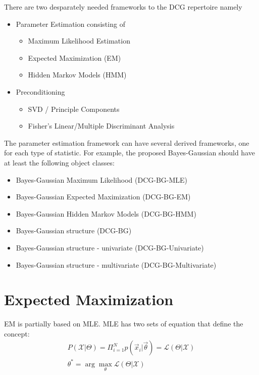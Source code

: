 There are two desparately needed frameworks to the DCG repertoire namely  
\begin{itemize}
	\item Parameter Estimation consisting of 
	\begin{itemize}
		\item Maximum Likelihood Estimation
		\item Expected Maximization (EM)
		\item Hidden Markov Models (HMM)
	\end{itemize}
	
	\item Preconditioning
	\begin{itemize}
		\item SVD / Principle Components
		\item Fisher's Linear/Multiple Discriminant Analysis
	\end{itemize}
	
\end{itemize}

The parameter estimation framework can have several derived frameworks, one for each type of statistic.  For example, the proposed Bayes-Gaussian should have at least the following object classes:
\begin{itemize}
	\item Bayes-Gaussian Maximum Likelihood (DCG-BG-MLE)
	\item Bayes-Gaussian Expected Maximization (DCG-BG-EM) 
	\item Bayes-Gaussian Hidden Markov Models (DCG-BG-HMM)
	\item Bayes-Gaussian structure (DCG-BG)
	\item Bayes-Gaussian structure - univariate (DCG-BG-Univariate)
	\item Bayes-Gaussian structure - multivariate (DCG-BG-Multivariate)
\end{itemize}

\section{Expected Maximization}

EM is partially based on MLE.   MLE has two sets of equation that define the concept:
\begin{eqnarray}
	P( \mathcal{X} | {\Theta}) = \Pi _{i=1}^N p( \vec{x}_i | \vec{\theta}) = \mathcal{L}(\Theta | \mathcal{X}) \\
	\theta ^*  = \arg \max_{\theta} \mathcal{L} (\Theta | \mathcal{X}) 
\end{eqnarray}


